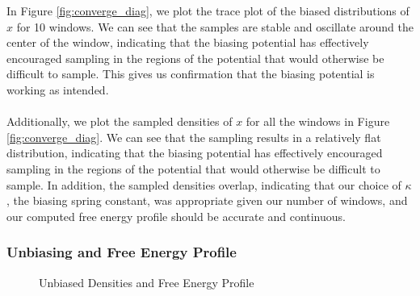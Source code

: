\documentclass{article}
\begin{document}
In Figure \ref{fig:converge_diag}, we plot the trace plot of the biased distributions of $x$ for 10 windows. We can see that the samples are stable and oscillate around the center of the window, indicating that the biasing potential has effectively encouraged sampling in the regions of the potential that would otherwise be difficult to sample. This gives us confirmation that the biasing potential is working as intended.
\\\\
Additionally, we plot the sampled densities of $x$ for all the windows in Figure \ref{fig:converge_diag}. We can see that the sampling results in a relatively flat distribution, indicating that the biasing potential has effectively encouraged sampling in the regions of the potential that would otherwise be difficult to sample. In addition, the sampled densities overlap, indicating that our choice of $\kappa$, the biasing spring constant, was appropriate given our number of windows, and our computed free energy profile should be accurate and continuous.

\subsubsection{Unbiasing and Free Energy Profile}

\begin{figure}[h]%
    \centering
    \qquad
    \caption{Unbiased Densities and Free Energy Profile}%
    \label{fig:unbiased_densities}%
\end{figure}
\end{document}
